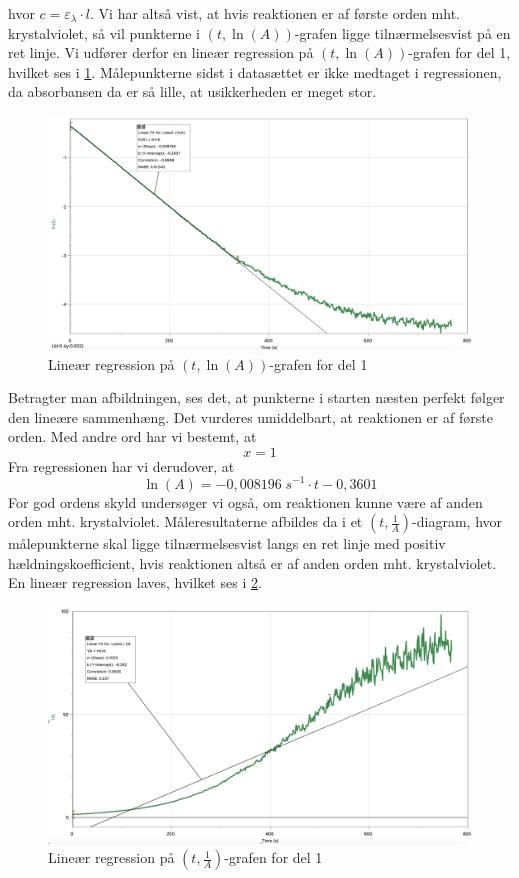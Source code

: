 \documentclass{report}
\begin{document}
hvor $c=\varepsilon _{\lambda } \cdot l$.
Vi har altså vist, at hvis reaktionen er af første orden mht. krystalviolet, så vil punkterne i $(t,\ln\left(A\right) )$-grafen ligge tilnærmelsesvist på en ret linje.
Vi udfører derfor en lineær regression på $(t,\ln\left(A\right) )$-grafen for del 1, hvilket ses i \cref{fig:tlnA1}.
Målepunkterne sidst i datasættet er ikke medtaget i regressionen, da absorbansen da er så lille, at usikkerheden er meget stor.
\begin{figure}[H]
\begin{center}
  \includegraphics[width=\textwidth]{tlnA1.png}
\end{center}
  \caption{Lineær regression på $(t,\ln\left(A\right)) $-grafen for del 1}
\label{fig:tlnA1}
\end{figure}
Betragter man afbildningen, ses det, at punkterne i starten næsten perfekt følger den lineære sammenhæng.
Det vurderes umiddelbart, at reaktionen er af første orden.
Med andre ord har vi bestemt, at 
\[
x=1
\] 
Fra regressionen har vi derudover, at
\begin{equation}
\ln(A) =-0,008196 \;\unit{s ^{-1}} \cdot t -0,3601
  \label{eq:lnA1}
\end{equation}
For god ordens skyld undersøger vi også, om reaktionen kunne være af anden orden mht. krystalviolet.
Måleresultaterne afbildes da i et $(t,\frac{1}{A})$-diagram, hvor målepunkterne skal ligge tilnærmelsesvist langs en ret linje med positiv hældningskoefficient, hvis reaktionen altså er af anden orden mht. krystalviolet.
En lineær regression laves, hvilket ses i \cref{fig:t1/A}.
\begin{figure}[H]
\begin{center}
  \includegraphics[width=\textwidth]{t1:A.png}
\end{center}
  \caption{Lineær regression på $(t,\frac{1}{A})$-grafen for del 1}
\label{fig:t1/A}
\end{figure}
\end{document}
